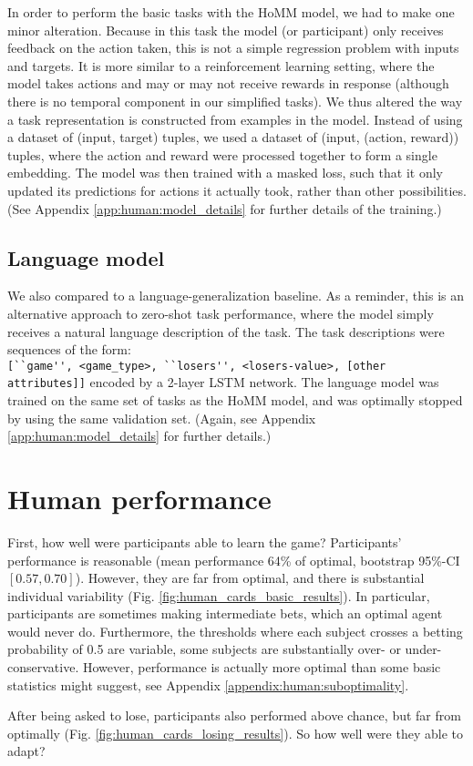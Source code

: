 In order to perform the basic tasks with the HoMM model, we had to make one minor alteration. Because in this task the model (or participant) only receives feedback on the action taken, this is not a simple regression problem with inputs and targets. It is more similar to a reinforcement learning setting, where the model takes actions and may or may not receive rewards in response (although there is no temporal component in our simplified tasks). We thus altered the way a task representation is constructed from examples in the model. Instead of using a dataset of (input, target) tuples, we used a dataset of (input, (action, reward)) tuples, where the action and reward were processed together to form a single embedding. The model was then trained with a masked loss, such that it only updated its predictions for actions it actually took, rather than other possibilities. (See Appendix \ref{app:human:model_details} for further details of the training.) \par

\subsection{Language model}

We also compared to a language-generalization baseline. As a reminder, this is an alternative approach to zero-shot task performance, where the model simply receives a natural language description of the task. The task descriptions were sequences of the form:\\\verb|[``game'', <game_type>, ``losers'', <losers-value>, [other attributes]]| encoded by a 2-layer LSTM network. The language model was trained on the same set of tasks as the HoMM model, and was optimally stopped by using the same validation set. (Again, see Appendix \ref{app:human:model_details} for further details.)


\section{Human performance}
First, how well were participants able to learn the game? Participants' performance is reasonable (mean performance 64\% of optimal, bootstrap 95\%-CI \([0.57, 0.70]\)). However, they are far from optimal, and there is substantial individual variability (Fig. \ref{fig:human_cards_basic_results}). In particular, participants are sometimes making intermediate bets, which an optimal agent would never do. Furthermore, the thresholds where each subject crosses a betting probability of 0.5 are variable, some subjects are substantially over- or under-conservative. However, performance is actually more optimal than some basic statistics might suggest, see Appendix \ref{appendix:human:suboptimality}. \par 
After being asked to lose, participants also performed above chance, but far from optimally (Fig. \ref{fig:human_cards_losing_results}). So how well were they able to adapt? 

